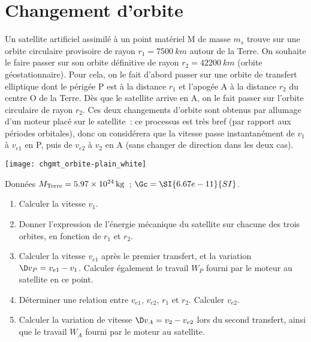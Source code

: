 \documentclass[a4paper, 12pt, final, garamond]{book}
\begin{document}
\section{Changement d'orbite}

\begin{minipage}{0.70\linewidth}
    Un satellite artificiel assimilé à un point matériel M de masse $m_s$ trouve
    sur une orbite circulaire provisoire de rayon $r_1 = \SI{7500}{km}$ autour
    de la Terre. On souhaite le faire passer sur son orbite définitive de rayon
    $r_2 = \SI{42200}{km}$ (orbite géostationnaire). Pour cela, on le fait
    d'abord passer sur une orbite de transfert elliptique dont le périgée P est
    à la distance $r_1$ et l'apogée A à la distance $r_2$ du centre O de la
    Terre. Dès que le satellite arrive en A, on le fait passer sur l'orbite
    circulaire de rayon $r_2$. Ces deux changements d'orbite sont obtenus par
    allumage d'un moteur placé sur le satellite~: ce processus est très bref
    (par rapport aux périodes orbitales), donc on considérera que la vitesse
    passe instantanément de $v_1$ à $v_{e1}$ en P, puis de $v_{e2}$ à $v_2$ en A
    (sans changer de direction dans les deux cas).
\end{minipage}
\hfill
\begin{minipage}{0.25\linewidth}
    \begin{center}
        \texttt{[image: chgmt\_orbite-plain\_white]}
    \end{center}
\end{minipage}
\begin{rdefi}{Données}
    $M_{\rm Terre} = \SI{5.97e24}{kg}$~; $\Gc = \SI{6.67e-11}{SI}$.
\end{rdefi}

\begin{enumerate}
    \item Calculer la vitesse $v_1$.
    \item Donner l'expression de l'énergie mécanique du satellite sur chacune
        des trois orbites, en fonction de $r_1$ et $r_2$.
    \item Calculer la vitesse $v_{e1}$ après le premier transfert, et la
        variation $\D v_P = v_{e1}-v_1$. Calculer également le travail $W_P$
        fourni par le moteur au satellite en ce point.
    \item Déterminer une relation entre $v_{e1}$, $v_{e2}$, $r_1$ et $r_2$.
        Calculer $v_{e2}$.
    \item Calculer la variation de vitesse $\D v_A = v_2 - v_{e2}$ lors du
        second transfert, ainsi que le travail $W_A$ fourni par le moteur au
        satellite.
\end{enumerate}

\end{document}
